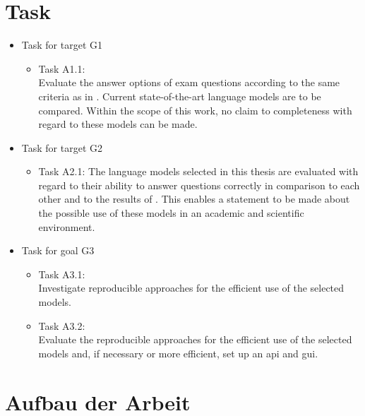 \section{Task}
\begin{itemize}
  \item Task for target G1
        \begin{itemize}
          \item Task A1.1:\\Evaluate the answer options of exam questions according to the same criteria as in \citet{Paul_Keller}.
          Current state-of-the-art language models are to be compared. Within the scope of this work, no claim to completeness with regard to these models can be made. 
          \end{itemize}
 \item Task for target G2
    \begin{itemize}
          \item Task A2.1: The language models selected in this thesis are evaluated with regard to their ability to answer questions correctly in comparison to each other and to the results of \citet{Paul_Keller}.\@
          This enables a statement to be made about the possible use of these models in an academic and scientific environment.
        \end{itemize}
  \item Task for goal G3
        \begin{itemize}
          \item Task A3.1:\\Investigate reproducible approaches for the efficient use of the selected models.
          \item Task A3.2:\\Evaluate the reproducible approaches for the efficient use of the selected models and, if necessary or more efficient, set up an \ac{api} and \ac{gui}.
        \end{itemize}
\end{itemize}



\section{Aufbau der Arbeit}
